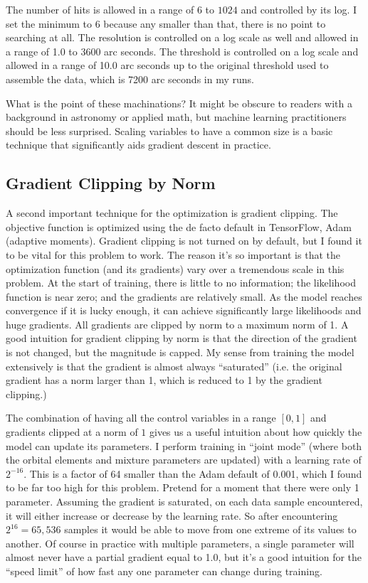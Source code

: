 The number of hits  is allowed in a range of $6$ to $1024$ and controlled by its log.
I set the minimum to $6$ because any smaller than that, there is no point to searching at all.
The resolution is controlled on a log scale as well and allowed in a range of 1.0 to 3600 arc seconds.
The threshold is controlled on a log scale and allowed in a range of 10.0 arc seconds 
up to the original threshold used to assemble the data, which is 7200 arc seconds in my runs.

What is the point of these machinations?
It might be obscure to readers with a background in astronomy or applied math, but machine learning practitioners should be less surprised.
Scaling variables to have a common size is a basic technique that significantly aids gradient descent in practice.

\subsection{Gradient Clipping by Norm}
A second important technique for the optimization is gradient clipping.
The objective function is optimized using the de facto default in TensorFlow, Adam (adaptive moments).
Gradient clipping is not turned on by default, but I found it to be vital for this problem to work.
The reason it's so important is that the optimization function (and its gradients) vary over a tremendous scale in this problem.
At the start of training, there is little to no information; the likelihood function is near zero; and the gradients are relatively small.
As the model reaches convergence if it is lucky enough, it can achieve significantly large likelihoods and huge gradients.
All gradients are clipped by norm to a maximum norm of 1.
A good intuition for gradient clipping by norm is that the direction of the gradient is not changed, but the magnitude is capped.
My sense from training the model extensively is that the gradient is almost always ``saturated'' 
(i.e. the original gradient has a norm larger than 1, which is reduced to 1 by the gradient clipping.)

The combination of having all the control variables in a range $[0, 1]$ and gradients clipped at a norm of $1$
gives us a useful intuition about how quickly the model can update its parameters.
I perform training in ``joint mode'' (where both the orbital elements and mixture parameters are updated) with a learning rate of $2^{-16}$.  
This is a factor of 64 smaller than the Adam default of 0.001, which I found to be far too high for this problem.
Pretend for a moment that there were only 1 parameter.  
Assuming the gradient is saturated, on each data sample encountered, it will either increase or decrease by the learning rate.
So after encountering $2^{16} = 65,536$ samples it would be able to move from one extreme of its values to another.
Of course in practice with multiple parameters, a single parameter will almost never have a partial gradient equal to 1.0,
but it's a good intuition for the ``speed limit'' of how fast any one parameter can change during training.

